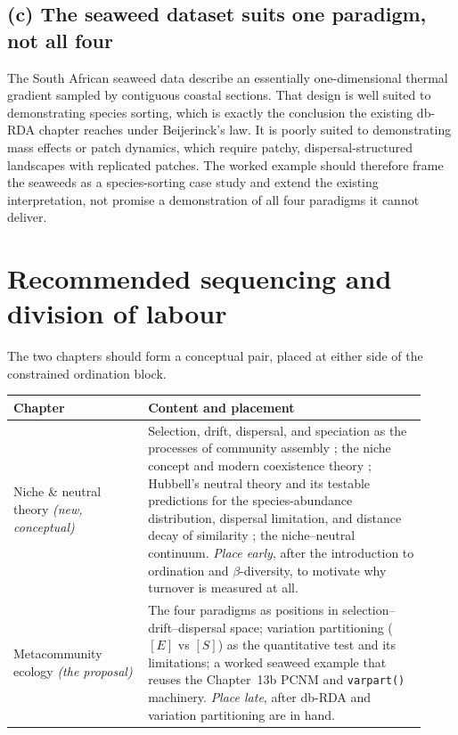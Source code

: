 \documentclass[11pt,a4paper]{article}
\newcommand{\fname}[1]{\texttt{\small #1}}
\begin{document}
\subsection*{(c) The seaweed dataset suits one paradigm, not all four}
The South African seaweed data describe an essentially one-dimensional thermal gradient
sampled by contiguous coastal sections. That design is well suited to demonstrating
species sorting, which is exactly the conclusion the existing db-RDA chapter reaches under
Beijerinck's law. It is poorly suited to demonstrating mass effects or patch dynamics,
which require patchy, dispersal-structured landscapes with replicated patches. The worked
example should therefore frame the seaweeds as a species-sorting case study and extend the
existing interpretation, not promise a demonstration of all four paradigms it cannot
deliver.

\section{Recommended sequencing and division of labour}

The two chapters should form a conceptual pair, placed at either side of the constrained
ordination block.

\begin{center}
\begin{tabular}{@{}>{\raggedright\arraybackslash}p{0.30\linewidth} >{\raggedright\arraybackslash}p{0.62\linewidth}@{}}
\toprule
\textbf{Chapter} & \textbf{Content and placement}\\
\midrule
Niche \& neutral theory \emph{(new, conceptual)} &
Selection, drift, dispersal, and speciation as the processes of community assembly
\citep{vellend2010}; the niche concept and modern coexistence theory
\citep{chase2003, hillerislambers2012}; Hubbell's neutral theory and its testable
predictions for the species-abundance distribution, dispersal limitation, and distance
decay of similarity \citep{hubbell2001}; the niche--neutral continuum. \emph{Place early},
after the introduction to ordination and $\beta$-diversity, to motivate why turnover is
measured at all.\\
\addlinespace
Metacommunity ecology \emph{(the proposal)} &
The four paradigms as positions in selection--drift--dispersal space; variation
partitioning ($[E]$ vs $[S]$) as the quantitative test and its limitations; a worked
seaweed example that reuses the Chapter~13b PCNM and \fname{varpart()} machinery.
\emph{Place late}, after db-RDA and variation partitioning are in hand.\\
\bottomrule
\end{tabular}
\end{center}
\end{document}
